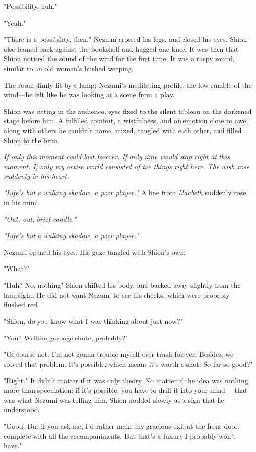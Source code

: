 "Possibility, huh."

"Yeah."

"There is a possibility, then." Nezumi crossed his legs, and closed his
eyes. Shion also leaned back against the bookshelf and hugged one knee.
It was then that Shion noticed the sound of the wind for the first time.
It was a raspy sound, similar to an old woman's hushed weeping.

The room dimly lit by a lamp; Nezumi's meditating profile; the low
rumble of the wind---he felt like he was looking at a scene from a play.

Shion was sitting in the audience, eyes fixed to the silent tableau on
the darkened stage before him. A fulfilled comfort, a wistfulness, and
an emotion close to awe, along with others he couldn't name, mixed,
tangled with each other, and filled Shion to the brim.

\emph{If only this moment could last forever. If only time would stop right at
this moment. If only my entire world consisted of the things right here.
The wish rose suddenly in his heart.}

\emph{"Life's but a walking shadow, a poor player."} A line from \emph{Macbeth}
suddenly rose in his mind.

\emph{"Out, out, brief candle."}

\emph{"Life's but a walking shadow, a poor player."}

Nezumi opened his eyes. His gaze tangled with Shion's own.

"What?"

"Huh? No, nothing\el " Shion shifted his body, and backed away slightly
from the lamplight. He did not want Nezumi to see his cheeks, which were
probably flushed red.

"Shion, do you know what I was thinking about just now?"

"You? Well\el the garbage chute, probably?"

"Of course not. I'm not gonna trouble myself over trash forever.
Besides, we solved that problem. It's possible, which means it's worth a
shot. So far so good?"

"Right." It didn't matter if it was only theory. No matter if the idea
was nothing more than speculation; if it's possible, you have to drill
it into your mind--- that was what Nezumi was telling him. Shion nodded
slowly as a sign that he understood.

"Good. But if you ask me, I'd rather make my gracious exit at the front
door, complete with all the accompaniments. But that's a luxury I
probably won't have."

